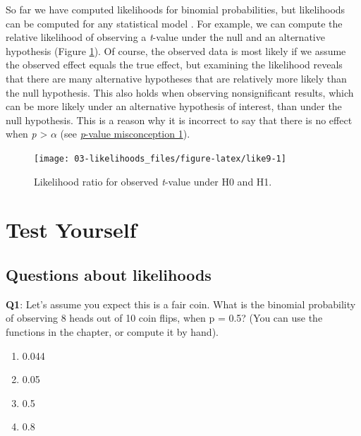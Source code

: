 \documentclass[
  oneside]{book}
\providecommand{\tightlist}{%
  \setlength{\itemsep}{0pt}\setlength{\parskip}{0pt}}
\begin{document}
So far we have computed likelihoods for binomial probabilities, but likelihoods can be computed for any statistical model \citep{glover_likelihood_2004, pawitan_all_2001}. For example, we can compute the relative likelihood of observing a \emph{t}-value under the null and an alternative hypothesis (Figure \ref{fig:like9}). Of course, the observed data is most likely if we assume the observed effect equals the true effect, but examining the likelihood reveals that there are many alternative hypotheses that are relatively more likely than the null hypothesis. This also holds when observing nonsignificant results, which can be more likely under an alternative hypothesis of interest, than under the null hypothesis. This is a reason why it is incorrect to say that there is no effect when \emph{p} \textgreater{} \(\alpha\) (see \protect\hyperlink{misconception1}{\emph{p}-value misconception 1}).



\begin{figure}

{\centering \texttt{[image: 03-likelihoods\_files/figure-latex/like9-1]} 

}

\caption{Likelihood ratio for observed \emph{t}-value under H0 and H1.}\label{fig:like9}
\end{figure}

\hypertarget{test-yourself-2}{%
\section{Test Yourself}\label{test-yourself-2}}

\hypertarget{questions-about-likelihoods}{%
\subsection{Questions about likelihoods}\label{questions-about-likelihoods}}

\textbf{Q1}: Let's assume you expect this is a fair coin. What is the binomial probability of observing 8 heads out of 10 coin flips, when p = 0.5? (You can use the functions in the chapter, or compute it by hand).

\begin{enumerate}
\def\labelenumi{\Alph{enumi})}
\tightlist
\item
  0.044
\item
  0.05
\item
  0.5
\item
  0.8
\end{enumerate}
\end{document}
